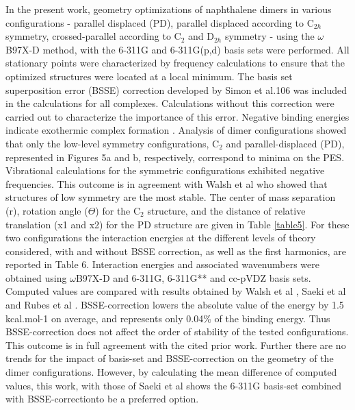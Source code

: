 In the present work, geometry optimizations of naphthalene dimers in various configurations - parallel displaced (PD), parallel displaced according to C$_{2h}$ symmetry, crossed-parallel according to C$_{2}$ and D$_{2h}$ symmetry - using the $\omega$B97X-D method, with the 6-311G and 6-311G(p,d) basis sets were performed. All stationary points were characterized by frequency calculations to ensure that the optimized structures were located at a local minimum. The basis set superposition error (BSSE) correction developed by Simon et al.106 was included in the calculations for all complexes. Calculations without this correction were carried out to characterize the importance of this error. Negative binding energies indicate exothermic complex formation \cite{boys2002calculation}. Analysis of dimer configurations showed that only the low-level symmetry configurations, C$_{2}$ and parallel-displaced (PD), represented in Figures 5a and b, respectively, correspond to minima on the PES. Vibrational calculations for the symmetric configurations exhibited negative frequencies. This outcome is in agreement with Walsh et al \cite{walsh2002ab} who showed that structures of low symmetry are the most stable. The center of mass separation (r), rotation angle ($\Theta$) for the C$_{2}$ structure, and the distance of relative translation (x1 and x2) for the PD structure are given in Table \ref{table5}. For these two configurations the interaction energies at the different levels of theory considered, with and without BSSE correction, as well as the first harmonics, are reported in Table 6. Interaction energies and associated wavenumbers were obtained using $\omega$B97X-D and 6-311G, 6-311G** and cc-pVDZ basis sets. Computed values are compared with results obtained by Walsh et al \cite{walsh2002ab}, Saeki et al \cite{saeki2006theoretical} and Rubes et al \cite{rubevs2008investigation}. BSSE-correction lowers the absolute value of the energy by 1.5 kcal.mol-1 on average, and represents only 0.04\% of the binding energy.  Thus BSSE-correction does not affect the order of stability of the tested configurations. This outcome is in full agreement with the cited prior work. Further there are no trends for the impact of basis-set and BSSE-correction on the geometry of the dimer configurations. However, by calculating the mean difference of computed values, this work, with those of Saeki et al \cite{saeki2006theoretical} shows the  6-311G basis-set combined with BSSE-correctionto be a preferred option.

